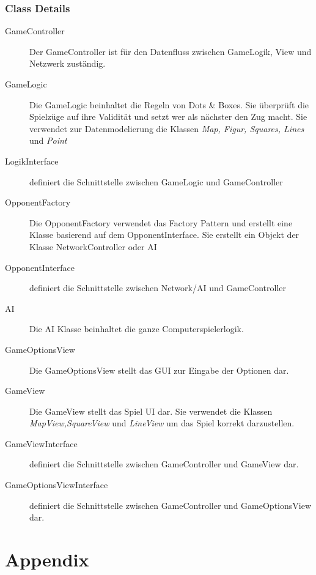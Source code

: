 \documentclass[a4paper, 10pt, fleqn]{article}
\begin{document}
			\subsubsection{Class Details}
				\begin{description}
					\item[GameController] Der GameController ist für den Datenfluss zwischen GameLogik, View und Netzwerk zuständig.
					\item[GameLogic] Die GameLogic beinhaltet die Regeln von Dots \& Boxes. Sie überprüft die Spielzüge auf ihre Validität und setzt wer als nächster den Zug macht. Sie verwendet zur Datenmodelierung die Klassen \textit{Map, Figur, Squares, Lines} und \textit{Point}
					\item[LogikInterface] definiert die Schnittstelle zwischen GameLogic und GameController
					\item[OpponentFactory] Die OpponentFactory verwendet das Factory Pattern und erstellt eine Klasse basierend auf dem OpponentInterface. Sie erstellt ein Objekt der Klasse NetworkController oder AI
					\item[OpponentInterface] definiert die Schnittstelle zwischen Network/AI und GameController
					\item[AI] Die AI Klasse beinhaltet die ganze Computerspielerlogik.
					\item[GameOptionsView] Die GameOptionsView stellt das GUI zur Eingabe der Optionen dar.
					\item[GameView] Die GameView stellt das Spiel UI dar. Sie verwendet die Klassen \textit{MapView,SquareView} und \textit{LineView} um das Spiel korrekt darzustellen.
					\item[GameViewInterface] definiert die Schnittstelle zwischen GameController und GameView dar.
					\item[GameOptionsViewInterface] definiert die Schnittstelle zwischen GameController und GameOptionsView dar.
				\end{description}
			
	\clearpage
	\section*{Appendix}
		
\end{document}

